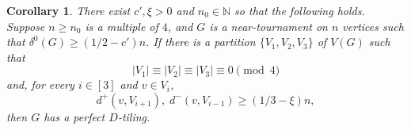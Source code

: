 \documentclass[11pt]{amsart}
\newtheorem{corollary}[theorem]{Corollary}
\def\N{\mathbb{N}}
\begin{document}
\begin{corollary}\label{cor:0mod4}
    There exist $c', \xi >0$ and $n_0\in \N$ so that the following holds. Suppose $n\ge n_0$ is a multiple of $4$, and $G$ is a near-tournament on $n$ vertices such that $\delta^0(G)\ge (1/2-c')n$. If there is a partition $\{V_1,V_2,V_3\}$ of $V(G)$ such that 
    \begin{equation} \label{eq:div}
        |V_1|\equiv |V_2|\equiv |V_3|\equiv 0\pmod 4
    \end{equation}
    and, for every $i\in [3]$ and $v\in V_i$, 
    \begin{equation} \label{eq:v}
        d^+(v,V_{i+1}), \; d^-(v,V_{i-1})\ge (1/3-\xi)n ,
    \end{equation}
    then $G$ has a perfect $D$-tiling.
\end{corollary}
\end{document}
